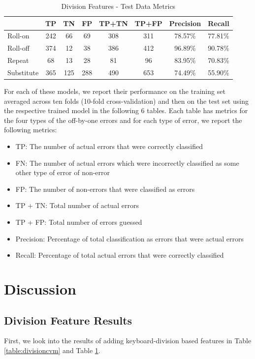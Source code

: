 \documentclass[letterpaper, 10 pt, conference]{ieeeconf}  %
\begin{document}
\begin{table}[h]
\begin{center}
\begin{tabular}{|l|c|c|c|c|c|c|c|} \hline
& TP & TN & FP & TP+TN & TP+FP & Precision & Recall \\ \hline
Roll-on & 242 & 66 & 69 & 308 & 311 & 78.57\% & 77.81\% \\ \hline
Roll-off & 374 & 12 & 38 & 386 & 412 & 96.89\% & 90.78\% \\ \hline
Repeat & 68 & 13 & 28 & 81 & 96 & 83.95\% & 70.83\% \\ \hline
Substitute & 365 & 125 & 288 & 490 & 653 & 74.49\% & 55.90\% \\ \hline
\end{tabular}
\caption{Division Features - Test Data Metrics}
\label{table:divisiontdm}
\end{center}
\end{table}

For each of these models, we report their performance on the training set averaged across ten folds (10-fold cross-validation) and then on the test set using the respective trained model in the following 6 tables. Each table has metrics for the four types of the off-by-one errors and for each type of error, we report the following metrics:
\begin{itemize}
\item TP: The number of actual errors that were correctly classified
\item FN: The number of actual errors which were incorrectly classified as some other type of error of non-error
\item FP: The number of non-errors that were classified as errors
\item TP + TN: Total number of actual errors
\item TP + FP: Total number of errors guessed
\item Precision: Percentage of total classification as errors that were actual errors
\item Recall: Percentage of total actual errors that were correctly classified
\end{itemize}

\section{Discussion}

\subsection{Division Feature Results}
First, we look into the results of adding keyboard-division based features in Table \ref{table:divisioncvm} and Table \ref{table:divisiontdm}. 
\end{document}
